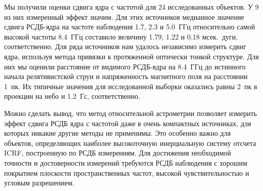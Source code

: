Мы получили оценки сдвига ядра с частотой для 24 исследованных объектов. У 9 из них измеренный
эффект значим. Для этих источников медианное значение сдвига РСДБ-ядра на частоте наблюдения 1.7,
2.3 и 5.0~ГГц относительно самой высокой частоты 8.4~ГГц составило величину 1.79, 1.22 и 0.18
мсек.~дуги, соответственно.
%
Для ряда источников нам удалось независимо измерить сдвиг ядра, используя метода привязки к
протяженной оптически тонкой структуре. Для них мы оценили расстояние от видимого РСДБ-ядра на
8.4~ГГц до истинного начала релятивистской струи и напряженность магнитного поля на расстоянии 1~пк.
Их типичные значения для исследованной выборки оказались равны 2~пк в проекции на небо и 1.2~Гс,
соответственно.

Можно сделать вывод, что метод относительной астрометрии позволяет измерить эффект сдвига РСДБ ядра
с частотой даже в очень компактных источниках, для которых никакие другие методы не применимы. Это
особенно важно для объектов, определяющих наиболее высокоточную инерциальную систему отсчета ICRF,
построенную по РСДБ измерениям. Для достижения необходимой точности и достоверности измерений
требуются РСДБ наблюдения с хорошим покрытием плоскости пространственных частот, высокой
чувствительностью и угловым разрешением.



